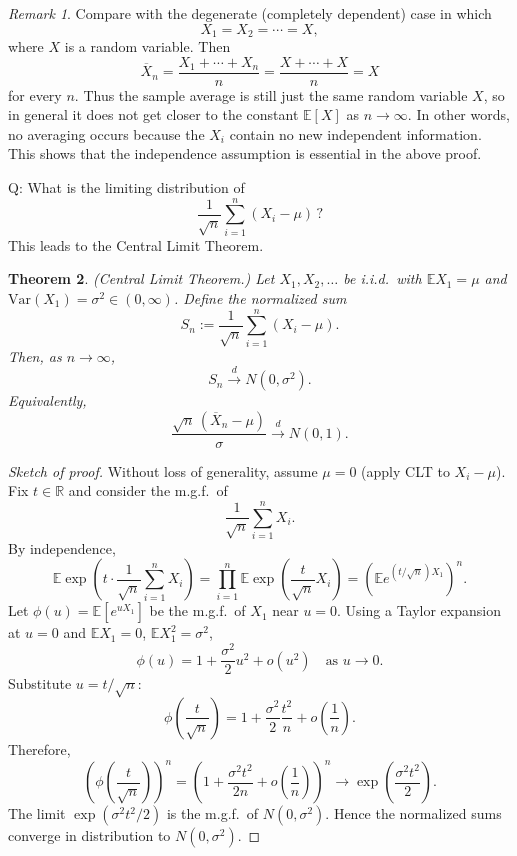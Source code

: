 \documentclass[11pt]{article}
\theoremstyle{plain}
\newtheorem{theorem}{Theorem}[section]
\theoremstyle{definition}
\theoremstyle{remark}
\newtheorem{remark}[theorem]{Remark}
\begin{document}
\begin{remark}
	Compare with the degenerate (completely dependent) case in which
	\[
	X_1=X_2=\cdots=X,
	\]
	where \(X\) is a random variable. Then
	\[
	\overline{X}_n=\frac{X_1+\cdots+X_n}{n}
	=\frac{X+\cdots+X}{n}
	=X
	\]
	for every \(n\). Thus the sample average is still just the same random variable \(X\), so in general it does not get closer to the constant \(\mathbb{E}[X]\) as \(n\to\infty\). In other words, no averaging occurs because the \(X_i\) contain no new independent information. This shows that the independence assumption is essential in the above proof.
\end{remark}


	Q: What is the limiting distribution of
	\[
	\frac{1}{\sqrt{n}}\sum_{i=1}^n (X_i-\mu)\,?
	\]
	This leads to the Central Limit Theorem.


\begin{theorem}
	(Central Limit Theorem.)
	Let \(X_1,X_2,\dots\) be i.i.d.\ with \(\mathbb{E}X_1=\mu\) and \(\mathrm{Var}(X_1)=\sigma^2\in(0,\infty)\).
	Define the normalized sum
	\[
	S_n:=\frac{1}{\sqrt{n}}\sum_{i=1}^n (X_i-\mu).
	\]
	Then, as \(n\to\infty\),
	\[
	S_n \xrightarrow{d} N(0,\sigma^2).
	\]
	Equivalently,
	\[
	\frac{\sqrt{n}\,(\overline{X}_n-\mu)}{\sigma}\xrightarrow{d} N(0,1).
	\]
\end{theorem}



\begin{proof}[Sketch of proof]
	Without loss of generality, assume \(\mu=0\) (apply CLT to \(X_i-\mu\)).
	Fix \(t\in\mathbb{R}\) and consider the m.g.f.\ of
	\[
	\frac{1}{\sqrt{n}}\sum_{i=1}^n X_i.
	\]
	By independence,
	\[
	\mathbb{E}\exp\!\left(t\cdot \frac{1}{\sqrt{n}}\sum_{i=1}^n X_i\right)
	=
	\prod_{i=1}^n \mathbb{E}\exp\!\left(\frac{t}{\sqrt{n}}X_i\right)
	=
	\left(\mathbb{E}e^{(t/\sqrt{n})X_1}\right)^n.
	\]
	Let \(\phi(u)=\mathbb{E}[e^{uX_1}]\) be the m.g.f.\ of \(X_1\) near \(u=0\).
	Using a Taylor expansion at \(u=0\) and \(\mathbb{E}X_1=0\), \(\mathbb{E}X_1^2=\sigma^2\),
	\[
	\phi(u)=1+\frac{\sigma^2}{2}u^2+o(u^2)
	\quad \text{as } u\to 0.
	\]
	Substitute \(u=t/\sqrt{n}\):
	\[
	\phi\!\left(\frac{t}{\sqrt{n}}\right)
	=
	1+\frac{\sigma^2}{2}\frac{t^2}{n}+o\!\left(\frac{1}{n}\right).
	\]
	Therefore,
	\[
	\left(\phi\!\left(\frac{t}{\sqrt{n}}\right)\right)^n
	=
	\left(1+\frac{\sigma^2 t^2}{2n}+o\!\left(\frac{1}{n}\right)\right)^n
	\longrightarrow
	\exp\!\left(\frac{\sigma^2 t^2}{2}\right).
	\]
	The limit \(\exp(\sigma^2 t^2/2)\) is the m.g.f.\ of \(N(0,\sigma^2)\).
	Hence the normalized sums converge in distribution to \(N(0,\sigma^2)\).
\end{proof}

	
	
\end{document}

